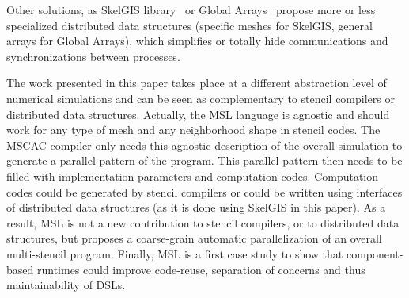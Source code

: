 Other solutions, as SkelGIS library~\cite{CPE:CPE3494} or Global Arrays~\cite{Nieplocha:2006:AAP:1125980.1125985} propose more or less specialized distributed data structures (specific meshes for SkelGIS, general arrays for Global Arrays), which simplifies or totally hide communications and synchronizations between processes.

The work presented in this paper takes place at a different abstraction level of numerical simulations and can be seen as complementary to stencil compilers or distributed data structures. Actually, the MSL language is agnostic and should work for any type of mesh and any neighborhood shape in stencil codes. The MSCAC compiler only needs this agnostic description of the overall simulation to generate a parallel pattern of the program. This parallel pattern then needs to be filled with implementation parameters and computation codes.
Computation codes could be generated by stencil compilers or could be written using interfaces of distributed data structures (as it is done using SkelGIS in this paper). As a result, MSL is not a new contribution to stencil compilers, or to distributed data structures, but proposes a coarse-grain automatic parallelization of an overall multi-stencil program.
Finally, MSL is a first case study to show that component-based runtimes could improve code-reuse, separation of concerns and thus maintainability of DSLs. 




